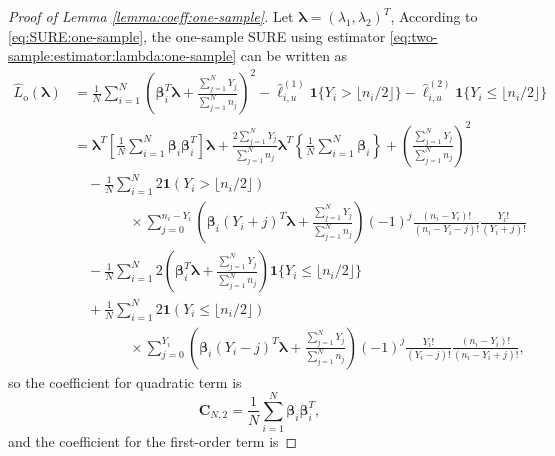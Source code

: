 \documentclass[12pt,letterpaper]{article}
\begin{document}
\begin{proof}[Proof of Lemma \ref{lemma:coeff:one-sample}]
Let $\boldsymbol{\lambda}=(\lambda_1,\lambda_2)^T$,
According to \eqref{eq:SURE:one-sample}, the one-sample SURE using estimator \eqref{eq:two-sample:estimator:lambda:one-sample} can be written as 
\begin{equation}\label{eq:SURE:one-sample:ML}
\begin{array}{rl}
    \hat{L}_{\mathrm{o}}(\boldsymbol{\lambda})\!\!\!\!\!\!&\displaystyle=\frac{1}{N}\sum_{i=1}^N\left(\boldsymbol{\beta}_i^T\boldsymbol{\lambda}+\frac{\sum_{j=1}^NY_j}{\sum_{j=1}^Nn_j}\right)^2-\hat{\ell}_{i,u}^{(1)}\mathbf{1}\{Y_i>\lfloor n_i/2\rfloor\}-\hat{\ell}_{i,u}^{(2)}\mathbf{1}\{Y_{i}\leq\lfloor n_i/2\rfloor\}\\
    &\displaystyle=\boldsymbol{\lambda}^T\left[\frac{1}{N}\sum_{i=1}^N\boldsymbol{\beta}_i\boldsymbol{\beta}_i^T\right]\boldsymbol{\lambda}+\frac{2\sum_{j=1}^NY_j}{\sum_{j=1}^Nn_j}\boldsymbol{\lambda}^T\left\{\frac{1}{N}\sum_{i=1}^N\boldsymbol{\beta}_i\right\}+\left(\frac{\sum_{j=1}^NY_j}{\sum_{j=1}^Nn_j}\right)^2\\
    &\displaystyle\quad-\frac{1}{N}\sum_{i=1}^N2\mathbf{1}(Y_{i} > \lfloor n_i/2\rfloor)\\
    &\displaystyle\quad\quad\quad\quad\times\sum_{j=0}^{n_{i}-Y_{i}}\!\!\!\left(\boldsymbol{\beta}_i(Y_i+j)^T\boldsymbol{\lambda}+\frac{\sum_{j=1}^NY_j}{\sum_{j=1}^Nn_j}\right)(-1)^{j}\frac{(n_{i}-Y_{i})!}{(n_{i}-Y_{i}-j)!}\frac{Y_{i}!}{(Y_{i}+j)!}\\
    &\displaystyle\quad-\frac{1}{N}\sum_{i=1}^N2\left(\boldsymbol{\beta}_i^T\boldsymbol{\lambda}+\frac{\sum_{j=1}^NY_j}{\sum_{j=1}^Nn_j}\right)\mathbf{1}\{Y_i\leq \lfloor n_i/2\rfloor\}\\
    &\displaystyle\quad+\frac{1}{N}\sum_{i=1}^N2\mathbf{1}(Y_{i}\leq \lfloor n_i/2\rfloor)\\
    &\displaystyle\quad\quad\quad\quad\times\sum_{j=0}^{Y_{i}}\left(\boldsymbol{\beta}_i(Y_i-j)^T\boldsymbol{\lambda}+\frac{\sum_{j=1}^NY_j}{\sum_{j=1}^Nn_j}\right)(-1)^{j}\frac{Y_{i}!}{(Y_{i}-j)!}\frac{(n_{i} - Y_{i})!}{(n_{i}-Y_{i}+j)!},
\end{array}
\end{equation}
so the coefficient for quadratic term is 
\begin{equation}\label{eq:coeff:quadratic:one-sample}
    \mathbf{C}_{N,2}=\frac{1}{N}\sum_{i=1}^N\boldsymbol{\beta}_i\boldsymbol{\beta}_i^T,
\end{equation}
and the coefficient for the first-order term is 

\end{proof}
\end{document}
